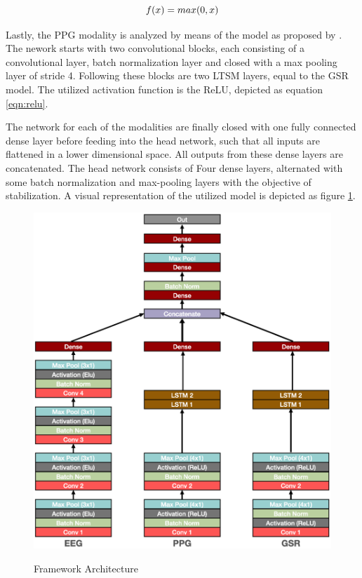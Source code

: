 \documentclass[12pt]{article}
\begin{document}
\begin{equation} 
\label{eqn:relu}
f(x)=max(0,x)
\bigskip
\end{equation}

Lastly, the PPG modality is analyzed by means of the model as proposed by . The nework starts with two convolutional blocks, each consisting of a convolutional layer, batch normalization layer and closed with a max pooling layer of stride 4. Following these blocks are two LTSM layers, equal to the GSR model. The utilized activation function is the ReLU, depicted as equation \ref{eqn:relu}.

The network for each of the modalities are finally closed with one fully connected dense layer before feeding into the head network, such that all inputs are flattened in a lower dimensional space. All outputs from these dense layers are concatenated. The head network consists of Four dense layers, alternated with some batch normalization and max-pooling layers with the objective of stabilization. A visual representation of the utilized model is depicted as figure \ref{fig:architecture}.

\begin{figure}
\caption{Framework Architecture}
\bigskip
\includegraphics[scale=0.725]{model_architecture}
\label{fig:architecture}
\end{figure}
\end{document}
